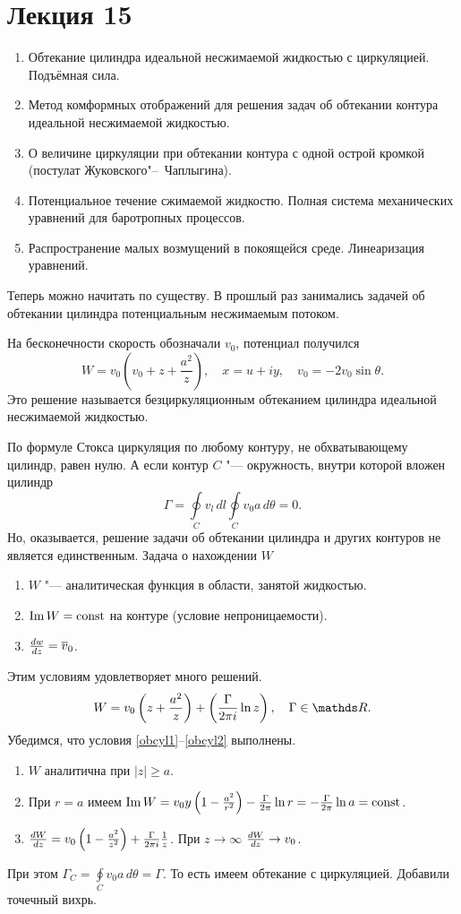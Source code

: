 \section{Лекция 15}
\begin{enumerate}
	\item Обтекание цилиндра идеальной несжимаемой жидкостью с циркуляцией. Подъёмная сила.
	\item Метод комформных отображений для решения задач об обтекании контура идеальной несжимаемой жидкостью.
	\item О величине циркуляции при обтекании контура с одной острой кромкой (постулат Жуковского"--~Чаплыгина).
	\item Потенциальное течение сжимаемой жидкостю. Полная система механических уравнений для баротропных процессов.
	\item Распространение малых возмущений в покоящейся среде. Линеаризация уравнений.
\end{enumerate}
Теперь можно начитать по существу. В прошлый раз занимались задачей об обтекании цилиндра потенциальным несжимаемым потоком.

На бесконечности скорость обозначали $v_0$, потенциал получился 
\[
	W = v_0\left( v_0+ z+\frac{a^2}z\right),\quad x = u+ iy,\quad v_0 = -2v_0\sin\theta.
\]	
Это решение называется безциркуляционным обтеканием цилиндра идеальной несжимаемой жидкостью.

По формуле Стокса циркуляция по любому контуру, не обхватывающему цилиндр, равен нулю. А если контур $C$ "--- окружность, внутри которой вложен цилиндр
\[
  \Gamma=\oint\limits_C v_l\,dl\oint\limits_Cv_0a\,d\theta = 0.
\]
Но, оказывается, решение задачи об обтекании цилиндра и других контуров не является единственным. Задача о нахождении $W$
\begin{enumerate}
	\item\label{obcyl1} $W$ "--- аналитическая функция в области, занятой жидкостью.
	\item\label{obcyl2} $\mathop{\mathrm{Im}} W = \operatorname{const}$ на контуре (условие непроницаемости).
	\item\label{obcyl3} $\frac{dw}{dz} = \overline{v}_0$.
\end{enumerate}
Этим условиям удовлетворяет много решений.
\[
	W = v_0\left(z+\frac{a^2}z\right)+\left( \frac\Gamma{2\pi i}\ln z \right),\quad \Gamma\in\R.
\]
Убедимся, что условия \eqref{obcyl1}--\eqref{obcyl2} выполнены.
\begin{enumerate}
	\item $W$ аналитична при $|z|\ge a$.
	\item При $r=a$ имеем $\mathop{\mathrm{Im}} W = v_0 y\left(1-\frac{a^2}{r^2}\right)-\frac\Gamma{2\pi}\ln r = -\frac\Gamma{2\pi}\ln a = \operatorname{const}$.
	\item $\frac{dW}{dz} = v_0\left(1-\frac{a^2}{z^2}\right)+\frac\Gamma{2\pi i}\frac1z$. При $z\to\infty$ $\frac{dW}{dz}\rightarrow v_0$.
\end{enumerate}
При этом $\Gamma_C = \oint\limits_C v_0 a\,d\theta = \Gamma$. То есть имеем обтекание с циркуляцией. Добавили точечный вихрь.

